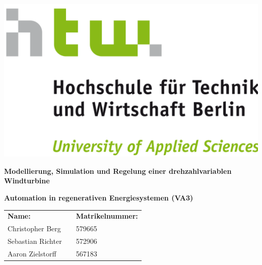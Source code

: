\documentclass[
	pagesize,
	fontsize=12pt,
	paper=a4,
	oneside,
    reqno
]{scrartcl}
\numberwithin{equation}{section} %
\numberwithin{table}{section} %
\numberwithin{figure}{section} %
\begin{document}
\begin{titlepage}
   \pagestyle{empty} %

   \begin{flushright}
   \includegraphics[scale=.07]{Bilder/LogoHTWBerlin.png}  \nocite{HTWgross}
   \end{flushright}

   \vspace{1cm}

   \begin{center}
      \Huge{\textbf{Modellierung, Simulation und Regelung einer drehzahlvariablen Windturbine}} \\
   \end{center}
   
   \vspace{0.5cm}
   
   \begin{center}
      \Large{\textbf{Automation in regenerativen Energiesystemen (VA3)}} \\
   \end{center}

   \vspace{3cm}

   \begin{flushleft}
      \begin{tabular}{l c l }
         \textbf{Name: }&\hspace{1 cm} &\textbf{Matrikelnummer:} \\
         Christopher Berg   & & 579665 \\
         Sebastian Richter  & & 572906 \\
         Aaron Zielstorff   & & 567183 \\
      \end{tabular}
   \end{flushleft}


\end{titlepage}
\end{document}
